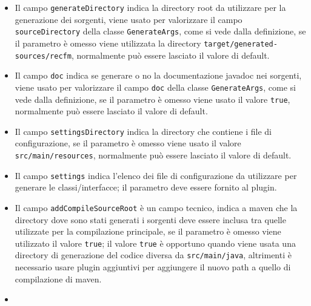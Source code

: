 \documentclass[a4paper,10pt]{report}
\begin{document}
\begin{itemize}
\item {}
	Il campo \verb!generateDirectory! indica la directory root da utilizzare 
	per la generazione dei sorgenti, viene usato per valorizzare il campo
	\verb!sourceDirectory! della classe \verb!GenerateArgs!, come si vede dalla 
	definizione, se il parametro è omesso viene utilizzata la directory 
	\verb!target/generated-sources/recfm!, normalmente può essere lasciato il 
	valore di default.
\item {}
	Il campo \verb!doc! indica se generare o no la documentazione javadoc nei
	sorgenti, viene usato per valorizzare il campo \verb!doc! della classe 
	\verb!GenerateArgs!, come si vede dalla definizione, se il parametro è 
	omesso viene usato il valore \verb!true!, normalmente può essere lasciato il 
	valore di default.
\item {}
	Il campo \verb!settingsDirectory! indica la directory che contiene i file
	di configurazione, se il parametro è omesso viene usato il valore 
	\verb!src/main/resources!, normalmente può essere lasciato il valore di 
	default.
\item {}
	Il campo \verb!settings! indica l'elenco dei file di configurazione da
	utilizzare per generare le classi/interfacce; il parametro deve essere 
	fornito al plugin.
\item {}
	Il campo \verb!addCompileSourceRoot! è un campo tecnico, indica a maven
	che la directory dove sono stati generati i sorgenti deve essere inclusa tra
	quelle utilizzate per la compilazione principale, se il parametro è omesso 
	viene utilizzato il valore \verb!true!; il valore \verb!true! è opportuno 
	quando viene usata una directory di generazione del codice diversa da 
	\verb!src/main/java!, altrimenti è necessario usare plugin aggiuntivi per 
	aggiungere il nuovo path a quello di compilazione di maven.
\item {}

\end{itemize}
\end{document}
